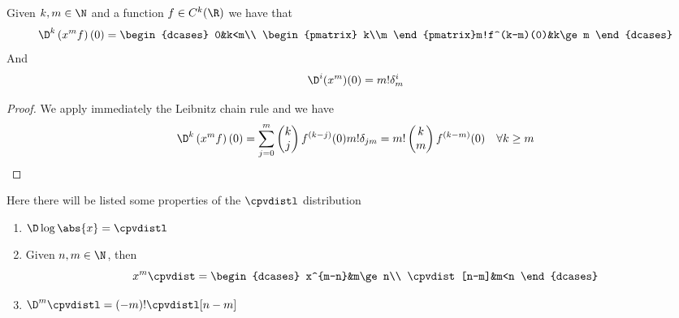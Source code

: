 \documentclass[../mmf.tex]{subfiles}
\begin{document}
\begin{thm}
	Given $k,m\in\N$ and a function $f\in C^k(\R)$ we have that
	\begin{equation*}
		\D^k\left( x^mf \right)(0)=\begin{dcases}
			0&k<m\\
			\begin{pmatrix}
				k\\m
			\end{pmatrix}m!f^(k-m)(0)&k\ge m
		\end{dcases}
	\end{equation*}
	And
	\begin{equation*}
		\D^i(x^m)(0)=m!\delta_m^i
	\end{equation*}
\end{thm}
\begin{proof}
	We apply immediately the Leibnitz chain rule and we have
	\begin{equation*}
		\D^k\left( x^mf \right)(0)=\sum_{j=0}^m\begin{pmatrix}
			k\\j
		\end{pmatrix}f^{(k-j)}(0)m!\delta_{jm}=m!\begin{pmatrix}
			k\\m
		\end{pmatrix}f^{(k-m)}(0)\quad\forall k\ge m
	\end{equation*}
\end{proof}
\begin{thm}
	Here there will be listed some properties of the $\cpvdistl$ distribution
	\begin{enumerate}
	\item $\D\log\abs{x}=\cpvdistl$
	\item Given $n,m\in\N$, then
		\begin{equation*}
			x^m\cpvdist=\begin{dcases}
				x^{m-n}&m\ge n\\
				\cpvdist[n-m]&m<n
			\end{dcases}
		\end{equation*}
	\item  $\D^m\cpvdistl=(-m)!\cpvdistl[n-m]$
	\end{enumerate}
\end{thm}
\end{document}
